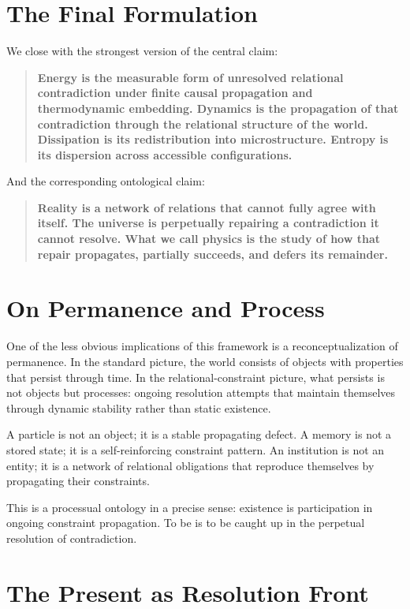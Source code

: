 \documentclass[12pt,a4paper,openany]{book}
\theoremstyle{plain}
\theoremstyle{definition}
\theoremstyle{remark}
\begin{document}
\section{The Final Formulation}

We close with the strongest version of the central claim:

\begin{quote}
\textbf{Energy is the measurable form of unresolved relational contradiction under finite causal propagation and thermodynamic embedding. Dynamics is the propagation of that contradiction through the relational structure of the world. Dissipation is its redistribution into microstructure. Entropy is its dispersion across accessible configurations.}
\end{quote}

And the corresponding ontological claim:

\begin{quote}
\textbf{Reality is a network of relations that cannot fully agree with itself. The universe is perpetually repairing a contradiction it cannot resolve. What we call physics is the study of how that repair propagates, partially succeeds, and defers its remainder.}
\end{quote}

\section{On Permanence and Process}

One of the less obvious implications of this framework is a reconceptualization of permanence. In the standard picture, the world consists of objects with properties that persist through time. In the relational-constraint picture, what persists is not objects but processes: ongoing resolution attempts that maintain themselves through dynamic stability rather than static existence.

A particle is not an object; it is a stable propagating defect. A memory is not a stored state; it is a self-reinforcing constraint pattern. An institution is not an entity; it is a network of relational obligations that reproduce themselves by propagating their constraints.

This is a processual ontology in a precise sense: existence is participation in ongoing constraint propagation. To be is to be caught up in the perpetual resolution of contradiction.

\section{The Present as Resolution Front}
\end{document}

